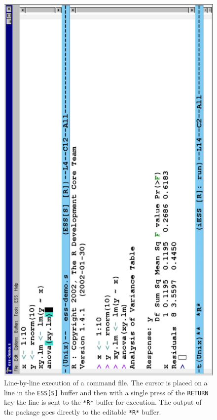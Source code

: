 \documentclass{article}
\newif\ifdraft
\newcommand{\stexttt}[1]{{\small\texttt{#1}}}
\newcommand{\emptyfig}{
\hspace*{42pt}\rule{324pt}{.25pt}\\
\hspace*{42pt}\rule{.25pt}{10pc}
\rule{316pt}{.25pt}
\rule{.25pt}{10pc}}
\begin{document}
\begin{figure}[tb] %
  \centering
  \ifdraft
     \emptyfig
  \else
     \includegraphics[angle=270,width=\textwidth]{ess-demo}
  \fi
  \caption{Line-by-line execution of a command file. The cursor is
    placed on a line in the \stexttt{ESS[S]} buffer and then with a single
    press of the \stexttt{RETURN} key
    the line is sent to the \stexttt{*R*} buffer for
    execution.  The output of the package goes directly to the
    editable \stexttt{*R*} buffer.}
  \label{f.ess-demo}
\end{figure}
\end{document}
